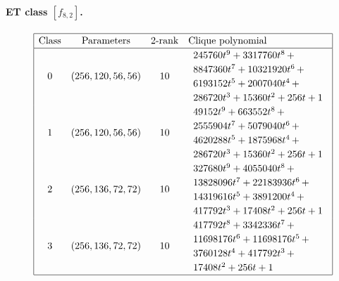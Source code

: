 \documentclass[12pt,a4paper]{article}
\begin{document}
%
\paragraph*{ET class $[f_{8,2}]$.}
%
\begin{table}[!bhpt] %
\small{}
\begin{align*}
\def\arraystretch{1.2}
\begin{array}{|cccl|}
\hline
\text{Class} &
\text{Parameters} &
\text{2-rank} &
\text{Clique polynomial}
\\
\hline
0 &
(256, 120, 56, 56) &
10 &
\begin{array}{l}
245760t^{9} + 3317760t^{8}
\,+
\\
 8847360t^{7} + 10321920t^{6}
\,+
\\
 6193152t^{5} + 2007040t^{4}
\,+
\\
 286720t^{3} + 15360t^{2} + 256t + 1
\end{array}
\\
1 &
(256, 120, 56, 56) &
10 &
\begin{array}{l}
49152t^{9} + 663552t^{8}
\,+
\\
 2555904t^{7} + 5079040t^{6}
\,+
\\
 4620288t^{5} + 1875968t^{4}
\,+
\\
 286720t^{3} + 15360t^{2} + 256t + 1
\end{array}
\\
2 &
(256, 136, 72, 72) &
10 &
\begin{array}{l}
327680t^{9} + 4055040t^{8}
\,+
\\
 13828096t^{7} + 22183936t^{6}
\,+
\\
 14319616t^{5} + 3891200t^{4}
\,+
\\
 417792t^{3} + 17408t^{2} + 256t + 1
\end{array}
\\
3 &
(256, 136, 72, 72) &
10 &
\begin{array}{l}
417792t^{8} + 3342336t^{7}
\,+
\\
 11698176t^{6} + 11698176t^{5}
\,+
\\
 3760128t^{4} + 417792t^{3}
\,+
\\
 17408t^{2} + 256t + 1
\end{array}
\\
\hline
\end{array}
\end{align*}
\caption{$f_{8,2}$ extended Cayley classes}
\label{tab-c8_2_EC_classes}
\end{table}
\end{document}
